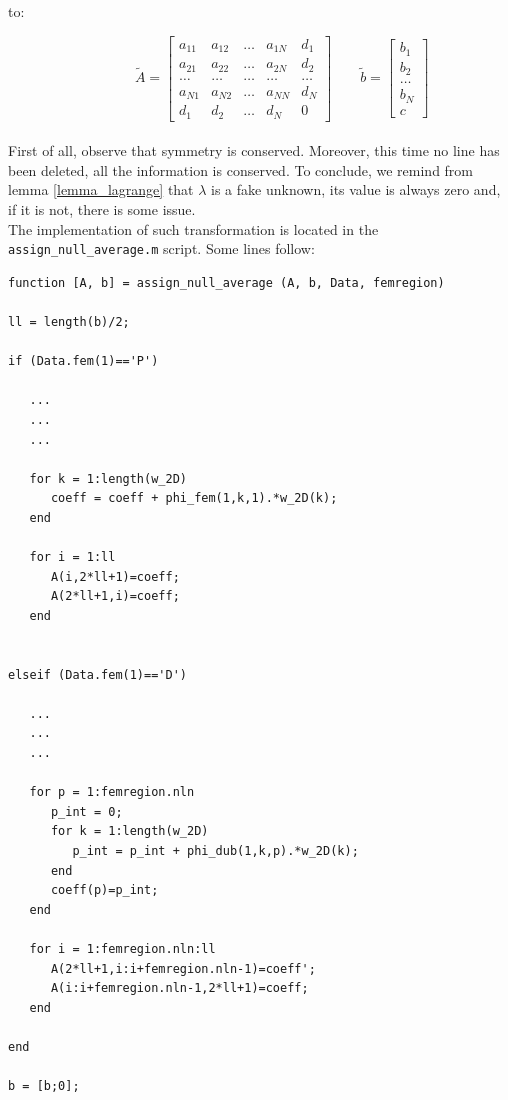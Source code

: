 \documentclass[a4paper,11pt]{article}
\begin{document}
to:

\begin{equation*}
\quad \quad  \quad \, \tilde{A}=\begin{bmatrix}
a_{11} & a_{12} & \dots & a_{1N} & d_1\\ 
a_{21} & a_{22} & \dots & a_{2N} & d_2 \\ 
\dots & \dots & \dots & \dots & \dots \\
a_{N1}  & a_{N2} & \dots & a_{NN} & d_N \\
d_1 & d_2 & \dots & d_N & 0
\end{bmatrix} \quad \quad
\tilde{b}=\begin{bmatrix}
b_1 \\ b_2 \\ \dots \\ b_N \\ c
\end{bmatrix}
\end{equation*}
\vspace{3mm} \\
\noindent First of all, observe that symmetry is conserved. Moreover, this time no line has been deleted, all the information is conserved. To conclude, we remind from lemma \ref{lemma_lagrange} that $\lambda$ is a fake unknown, its value is always zero and, if it is not, there is some issue. \\

\noindent The implementation of such transformation is located in the \texttt{assign\_null\_average.m} script. Some lines follow:

\begin{verbatim}
function [A, b] = assign_null_average (A, b, Data, femregion)

ll = length(b)/2;

if (Data.fem(1)=='P')

   ...
   ...
   ...

   for k = 1:length(w_2D)
      coeff = coeff + phi_fem(1,k,1).*w_2D(k);
   end

   for i = 1:ll
      A(i,2*ll+1)=coeff;
      A(2*ll+1,i)=coeff;
   end


elseif (Data.fem(1)=='D')

   ...
   ...
   ...

   for p = 1:femregion.nln
      p_int = 0;
      for k = 1:length(w_2D)
         p_int = p_int + phi_dub(1,k,p).*w_2D(k);
      end
      coeff(p)=p_int;
   end

   for i = 1:femregion.nln:ll
      A(2*ll+1,i:i+femregion.nln-1)=coeff';
      A(i:i+femregion.nln-1,2*ll+1)=coeff;
   end

end

b = [b;0];

\end{verbatim}
\end{document}
